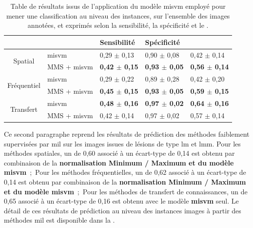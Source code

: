 \begin{table}[H]
    \centering
    \begin{tabular}{cllll}
        \toprule
        \multicolumn{1}{l}{}         &                      & Sensibilité               & Spécificité               & \Fscore{}                 \\ \midrule
        \multirow{2}{*}{Spatial}     & \gls{misvm}          & 0,29 $\pm$ 0,13             & 0,90 $\pm$ 0,08             & 0,42 $\pm$ 0,14             \\
                                     & MMS + \gls{misvm}    & \textbf{0,42 $\pm$ 0,15}    & \textbf{0,93 $\pm$ 0,05}    & \textbf{0,56 $\pm$ 0,14}    \\ \midrule
        \multirow{2}{*}{Fréquentiel} & \gls{misvm}          & 0,29 $\pm$ 0,22             & 0,89 $\pm$ 0,28             & 0,42 $\pm$ 0,20             \\
                                     & MMS + \gls{misvm}    & \textbf{0,45 $\pm$ 0,15}    & \textbf{0,93 $\pm$ 0,05}    & \textbf{0,59 $\pm$ 0,15}    \\ \midrule
        \multirow{2}{*}{Transfert}   & \gls{misvm}          & \textbf{0,48 $\pm$ 0,16}    & \textbf{0,97 $\pm$ 0,02}    & \textbf{0,64 $\pm$ 0,16}    \\
                                     & MMS + \gls{misvm}    & 0,42 $\pm$ 0,14             & 0,97 $\pm$ 0,02             & 0,57 $\pm$ 0,14             \\ \bottomrule
    \end{tabular}
    \caption{Table de résultats issus de l'application du modèle \gls{misvm} employé pour mener une classification au niveau des instances, sur l'ensemble des images annotées, et exprimés selon la sensibilité, la spécificité et le \fscore{}.}
    \label{tab:results_lesion_classification_weakly_image}
\end{table}

Ce second paragraphe reprend les résultats de prédiction des méthodes faiblement supervisées par \gls{mil} sur les images issues de lésions de type \gls{lm} et \gls{lmm}. Pour les méthodes spatiales, un \fscore{} de 0,60 associé à un écart-type de 0,14 est obtenu par combinaison de la \textbf{normalisation Minimum / Maximum et du modèle \gls{misvm}}~;~Pour les méthodes fréquentielles, un \fscore{} de 0,62 associé à un écart-type de 0,14 est obtenu par combinaison de la \textbf{normalisation Minimum / Maximum et du modèle \gls{misvm}}~;~Pour les méthodes de transfert de connaissances, un \fscore{} de 0,65 associé à un écart-type de 0,16 est obtenu avec le modèle \textbf{\gls{misvm}} seul. Le détail de ces résultats de prédiction au niveau des instances images à partir des méthodes \gls{mil} est disponible dans la .\par

